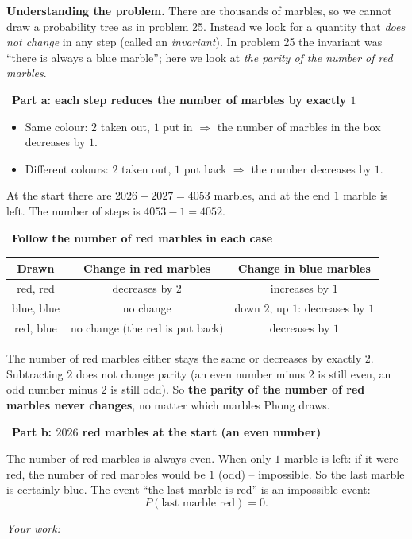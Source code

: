 \documentclass[11pt]{article}
\newif\ifsol \solfalse
\newcommand{\probsol}[1]{%
  \begin{lrbox}{\solmeasure}\begin{minipage}{\dimexpr\linewidth-24pt\relax}#1\end{minipage}\end{lrbox}%
  \ifsol
    \begin{solbox}#1\end{solbox}%
  \else
    \setlength{\solht}{\dimexpr\ht\solmeasure+\dp\solmeasure+0.85cm\relax}%
    \ifdim\solht<1.35cm\setlength{\solht}{1.35cm}\fi
    \ifdim\solht>\StudentMaxWork\setlength{\solht}{\StudentMaxWork}\fi
    \begin{tcolorbox}[colback=white,colframe=Line,boxrule=0.8pt,arc=5pt,
      left=8pt,right=8pt,top=4pt,bottom=4pt,height=\solht]{\footnotesize\color{Slate}\itshape\WorkWord}\end{tcolorbox}%
  \fi}
\newlength{\StudentMaxWork}\setlength{\StudentMaxWork}{7.5cm}
\newcommand{\step}[2]{\par\smallskip\noindent{\bfseries\color{tmBlue!85!black}\StepWord~#1.}\ {\bfseries #2}\par\nopagebreak}
\def\WorkWord{Your work:}
\def\StepWord{Step}
\begin{document}
\probsol{
\textbf{Understanding the problem.} There are thousands of marbles, so we cannot draw a probability tree as in problem 25. Instead we look for
a quantity that \emph{does not change} in any step (called an \emph{invariant}). In problem 25 the invariant was ``there is always a blue
marble''; here we look at \emph{the parity of the number of red marbles}.

\step{1}{Part a: each step reduces the number of marbles by exactly $1$}
\begin{itemize}[leftmargin=1.2em,itemsep=1pt,topsep=2pt]
\item Same colour: $2$ taken out, $1$ put in $\Rightarrow$ the number of marbles in the box decreases by $1$.
\item Different colours: $2$ taken out, $1$ put back $\Rightarrow$ the number decreases by $1$.
\end{itemize}
At the start there are $2026+2027=4053$ marbles, and at the end $1$ marble is left. The number of steps is $4053-1=4052$.

\step{2}{Follow the number of red marbles in each case}
\begin{center}\begin{tabular}{|c|c|c|}\hline
Drawn & Change in red marbles & Change in blue marbles\\\hline
red, red & decreases by $2$ & increases by $1$\\\hline
blue, blue & no change & down $2$, up $1$: decreases by $1$\\\hline
red, blue & no change (the red is put back) & decreases by $1$\\\hline
\end{tabular}\end{center}
\begin{proofbox}The number of red marbles either stays the same or decreases by exactly $2$. Subtracting $2$ does not change parity (an even
number minus $2$ is still even, an odd number minus $2$ is still odd). So \textbf{the parity of the number of red marbles never changes}, no
matter which marbles Phong draws.\end{proofbox}

\step{3}{Part b: $2026$ red marbles at the start (an even number)}
The number of red marbles is always even. When only $1$ marble is left: if it were red, the number of red marbles would be $1$ (odd) --
impossible. So the last marble is certainly blue. The event ``the last marble is red'' is an impossible event:
\[P(\text{last marble red})=0.\]

}
\end{document}
